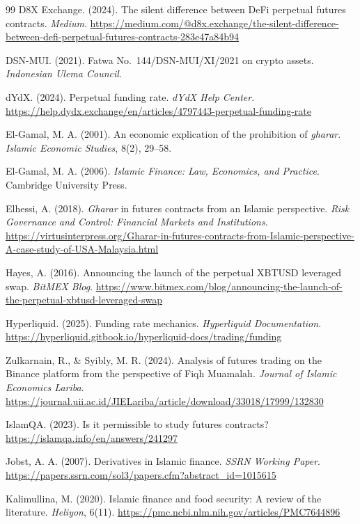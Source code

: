 \documentclass[10pt,twocolumn]{article}
\begin{document}
\begin{thebibliography}{99}
D8X Exchange. (2024).
The silent difference between DeFi perpetual futures contracts.
\textit{Medium}.
\url{https://medium.com/@d8x.exchange/the-silent-difference-between-defi-perpetual-futures-contracts-283e47a84b94}

DSN-MUI. (2021).
Fatwa No.\ 144/DSN-MUI/XI/2021 on crypto assets.
\textit{Indonesian Ulema Council}.

dYdX. (2024).
Perpetual funding rate.
\textit{dYdX Help Center}.
\url{https://help.dydx.exchange/en/articles/4797443-perpetual-funding-rate}

El-Gamal, M. A. (2001).
An economic explication of the prohibition of \textit{gharar}.
\textit{Islamic Economic Studies}, 8(2), 29--58.

El-Gamal, M. A. (2006).
\textit{Islamic Finance: Law, Economics, and Practice}.
Cambridge University Press.

Elhessi, A. (2018).
\textit{Gharar} in futures contracts from an Islamic perspective.
\textit{Risk Governance and Control: Financial Markets and Institutions}.
\url{https://virtusinterpress.org/Gharar-in-futures-contracts-from-Islamic-perspective-A-case-study-of-USA-Malaysia.html}

Hayes, A. (2016).
Announcing the launch of the perpetual XBTUSD leveraged swap.
\textit{BitMEX Blog}.
\url{https://www.bitmex.com/blog/announcing-the-launch-of-the-perpetual-xbtusd-leveraged-swap}

Hyperliquid. (2025).
Funding rate mechanics.
\textit{Hyperliquid Documentation}.
\url{https://hyperliquid.gitbook.io/hyperliquid-docs/trading/funding}

Zulkarnain, R., \& Syibly, M. R. (2024).
Analysis of futures trading on the Binance platform from the perspective of Fiqh Muamalah.
\textit{Journal of Islamic Economics Lariba}.
\url{https://journal.uii.ac.id/JIELariba/article/download/33018/17999/132830}

IslamQA. (2023).
Is it permissible to study futures contracts?
\url{https://islamqa.info/en/answers/241297}

Jobst, A. A. (2007).
Derivatives in Islamic finance.
\textit{SSRN Working Paper}.
\url{https://papers.ssrn.com/sol3/papers.cfm?abstract_id=1015615}

Kalimullina, M. (2020).
Islamic finance and food security: A review of the literature.
\textit{Heliyon}, 6(11).
\url{https://pmc.ncbi.nlm.nih.gov/articles/PMC7644896}


\end{thebibliography}
\end{document}

